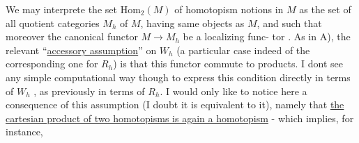 We may interprete the set $\mathrm{Hom}_2(M)$ of homotopism notions in $M$ as the
set of all quotient categories $M_h$ of $M$, having same  objects as $M$,
and such that moreover the canonical functor $M \to M_h$ be a localizing func-%
tor . As in A), the relevant ``\uline{accessory assumption}'' on $W_h$ (a particular
case indeed of the corresponding one for $R_h$) is that this functor commute
to products. I dont see any  simple computational way though to 
express this condition directly in terms of $W_h$ , as previously in terms of
$R_h$. I would only like to notice here a consequence of this assumption
(I doubt it is equivalent to it), namely that \uline{the cartesian product of
two homotopisms is again a homotopism} - which implies, for instance,

